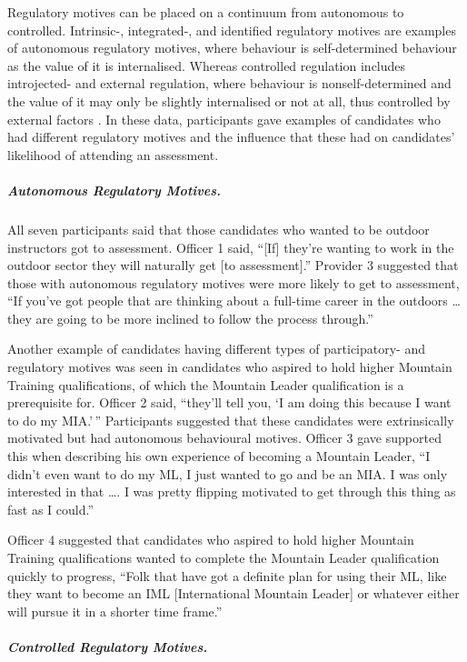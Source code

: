 \documentclass[
  12pt,
  a4paper,
]{book}
\begin{document}
Regulatory motives can be placed on a continuum from autonomous to controlled. Intrinsic-, integrated-, and identified regulatory motives are examples of autonomous regulatory motives, where behaviour is self-determined behaviour as the value of it is internalised. Whereas controlled regulation includes introjected- and external regulation, where behaviour is nonself-determined and the value of it may only be slightly internalised or not at all, thus controlled by external factors \citep{Deci2000}. In these data, participants gave examples of candidates who had different regulatory motives and the influence that these had on candidates' likelihood of attending an assessment.

\hypertarget{autonomous-regulatory-motives.}{%
\subparagraph{Autonomous Regulatory Motives.}\label{autonomous-regulatory-motives.}}

All seven participants said that those candidates who wanted to be outdoor instructors got to assessment. Officer 1 said, ``{[}If{]} they're wanting to work in the outdoor sector they will naturally get {[}to assessment{]}.'' Provider 3 suggested that those with autonomous regulatory motives were more likely to get to assessment, ``If you've got people that are thinking about a full-time career in the outdoors \ldots{} they are going to be more inclined to follow the process through.''

Another example of candidates having different types of participatory- and regulatory motives was seen in candidates who aspired to hold higher Mountain Training qualifications, of which the Mountain Leader qualification is a prerequisite for. Officer 2 said, ``they'll tell you, `I am doing this because I want to do my MIA.'\,'' Participants suggested that these candidates were extrinsically motivated but had autonomous behavioural motives. Officer 3 gave supported this when describing his own experience of becoming a Mountain Leader, ``I didn't even want to do my ML, I just wanted to go and be an MIA. I was only interested in that \ldots. I was pretty flipping motivated to get through this thing as fast as I could.''

Officer 4 suggested that candidates who aspired to hold higher Mountain Training qualifications wanted to complete the Mountain Leader qualification quickly to progress, ``Folk that have got a definite plan for using their ML, like they want to become an IML {[}International Mountain Leader{]} or whatever either will pursue it in a shorter time frame.''

\hypertarget{controlled-regulatory-motives.}{%
\subparagraph{Controlled Regulatory Motives.}\label{controlled-regulatory-motives.}}
\end{document}

